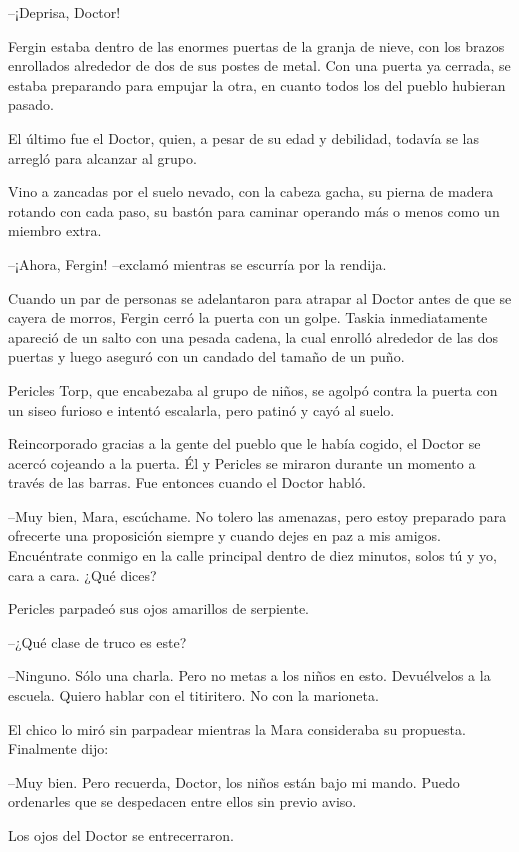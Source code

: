 --¡Deprisa, Doctor!

Fergin estaba dentro de las enormes puertas de la granja de nieve, con los brazos enrollados alrededor de dos de sus postes de metal. Con una puerta ya cerrada, se estaba preparando para empujar la otra, en cuanto todos los del pueblo hubieran pasado.

El último fue el Doctor, quien, a pesar de su edad y debilidad, todavía se las arregló para alcanzar al grupo.

Vino a zancadas por el suelo nevado, con la cabeza gacha, su pierna de madera rotando con cada paso, su bastón para caminar operando más o menos como un miembro extra.

--¡Ahora, Fergin! --exclamó mientras se escurría por la rendija.

Cuando un par de personas se adelantaron para atrapar al Doctor antes de que se cayera de morros, Fergin cerró la puerta con un golpe. Taskia inmediatamente apareció de un salto con una pesada cadena, la cual enrolló alrededor de las dos puertas y luego aseguró con un candado del tamaño de un puño.

Pericles Torp, que encabezaba al grupo de niños, se agolpó contra la puerta con un siseo furioso e intentó escalarla, pero patinó y cayó al suelo.

Reincorporado gracias a la gente del pueblo que le había cogido, el Doctor se acercó cojeando a la puerta. Él y Pericles se miraron durante un momento a través de las barras. Fue entonces cuando el Doctor habló.

--Muy bien, Mara, escúchame. No tolero las amenazas, pero estoy preparado para ofrecerte una proposición siempre y cuando dejes en paz a mis amigos. Encuéntrate conmigo en la calle principal dentro de diez minutos, solos tú y yo, cara a cara. ¿Qué dices?

Pericles parpadeó sus ojos amarillos de serpiente.

--¿Qué clase de truco es este?

--Ninguno. Sólo una charla. Pero no metas a los niños en esto. Devuélvelos a la escuela. Quiero hablar con el titiritero. No con la marioneta.

El chico lo miró sin parpadear mientras la Mara consideraba su propuesta. Finalmente dijo:

--Muy bien. Pero recuerda, Doctor, los niños están bajo mi mando. Puedo ordenarles que se despedacen entre ellos sin previo aviso.

Los ojos del Doctor se entrecerraron.

